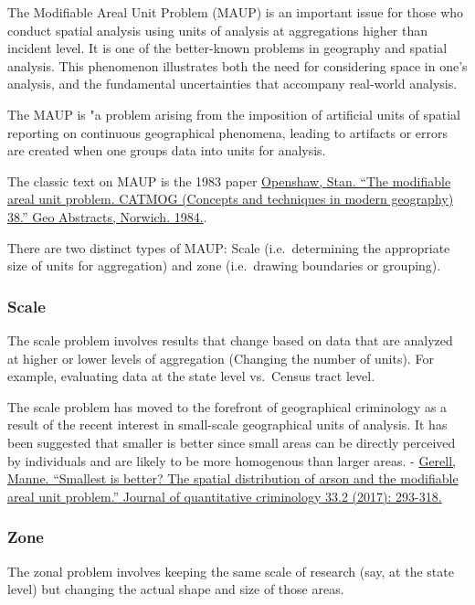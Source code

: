 \documentclass[]{book}
\begin{document}
The Modifiable Areal Unit Problem (MAUP) is an important issue for those who conduct spatial analysis using units of analysis at aggregations higher than incident level. It is one of the better-known problems in geography and spatial analysis. This phenomenon illustrates both the need for considering space in one's analysis, and the fundamental uncertainties that accompany real-world analysis.

The MAUP is "a problem arising from the imposition of artificial units of spatial reporting on continuous geographical phenomena, leading to artifacts or errors are created when one groups data into units for analysis.

The classic text on MAUP is the 1983 paper \href{https://www.uio.no/studier/emner/sv/iss/SGO9010/openshaw1983.pdf}{Openshaw, Stan. ``The modifiable areal unit problem. CATMOG (Concepts and techniques in modern geography) 38.'' Geo Abstracts, Norwich. 1984.}.

There are two distinct types of MAUP: Scale (i.e.~determining the appropriate size of units for aggregation) and zone (i.e.~drawing boundaries or grouping).

\hypertarget{scale}{%
\subsubsection{Scale}\label{scale}}

The scale problem involves results that change based on data that are analyzed at higher or lower levels of aggregation (Changing the number of units). For example, evaluating data at the state level vs.~Census tract level.

The scale problem has moved to the forefront of geographical criminology as a result of the recent interest in small-scale geographical units of analysis. It has been suggested that smaller is better since small areas can be directly perceived by individuals and are likely to be more homogenous than larger areas.
- \href{https://link.springer.com/article/10.1007/s10940-016-9297-6}{Gerell, Manne. ``Smallest is better? The spatial distribution of arson and the modifiable areal unit problem.'' Journal of quantitative criminology 33.2 (2017): 293-318.}

\hypertarget{zone}{%
\subsubsection{Zone}\label{zone}}

The zonal problem involves keeping the same scale of research (say, at the state level) but changing the actual shape and size of those areas.
\end{document}
